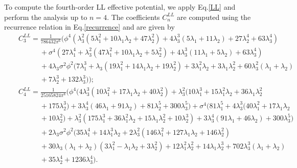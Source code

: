 \documentclass[11pt,a4paper,english,superscriptaddress,preprint,aps,prd]{revtex4}
\begin{document}
To compute the fourth-order LL effective potential, we apply Eq.\eqref{LL} and perform the analysis up to $n=4$. The coefficients $C_n^{LL}$ are computed using the recurrence relation in Eq.\ref{recurrence} and are given by
\begin{subequations}
 \begin{eqnarray}
  &&C_3^{LL} = \frac{1}{786432 \pi ^6}\Bigr(\phi ^4 \left(\lambda_3^2 \left(5 \lambda_1^2+10 \lambda_1 \lambda_2+47 \lambda_2^2\right)+4 \lambda_3^3 (5 \lambda_1+11 \lambda_2)+27 \lambda_2^4+63 \lambda_3^4\right)\nonumber\\
  &&\qquad\quad+\sigma ^4 \left(27 \lambda_1^4+\lambda_3^2 \left(47 \lambda_1^2+10 \lambda_1 \lambda_2+5 \lambda_2^2\right)+4 \lambda_3^3 (11 \lambda_1+5 \lambda_2)+63 \lambda_3^4\right)\nonumber\\
  &&\qquad\quad+4 \lambda_3 \sigma ^2 \phi ^2 (7 \lambda_1^3+\lambda_3 \left(19 \lambda_1^2+14 \lambda_1 \lambda_2+19 \lambda_2^2\right)+3 \lambda_1^2 \lambda_2+3 \lambda_1 \lambda_2^2+60 \lambda_3^2 (\lambda_1+\lambda_2)\nonumber\\
  &&\qquad\quad+7 \lambda_2^3+132 \lambda_3^3)\Bigr);\\
  &&C_4^{LL} = \frac{1}{25165824 \pi ^8}\Bigr(\phi ^4 (4 \lambda_3^3 \left(10 \lambda_1^2+17 \lambda_1 \lambda_2+40 \lambda_2^2\right)+\lambda_3^2 (10 \lambda_1^3+15 \lambda_1^2 \lambda_2+36 \lambda_1 \lambda_2^2\nonumber\\
  &&\qquad\quad+175 \lambda_2^3)+3 \lambda_3^4 (46 \lambda_1+91 \lambda_2)+81 \lambda_2^5+300 \lambda_3^5)+\sigma ^4 (81 \lambda_1^5+4 \lambda_3^3 (40 \lambda_1^2+17 \lambda_1 \lambda_2\nonumber\\
  &&\qquad\quad+10 \lambda_2^2)+\lambda_3^2 (175 \lambda_1^3+36 \lambda_1^2 \lambda_2+15 \lambda_1 \lambda_2^2+10 \lambda_2^3)+3 \lambda_3^4 (91 \lambda_1+46 \lambda_2)+300 \lambda_3^5)\nonumber\\
  &&\qquad\quad+2 \lambda_3 \sigma ^2 \phi ^2 (35 \lambda_1^4+14 \lambda_1^3 \lambda_2+2 \lambda_3^2 \left(146 \lambda_1^2+127 \lambda_1 \lambda_2+146 \lambda_2^2\right)\nonumber\\
  &&\qquad\quad+30 \lambda_3 (\lambda_1+\lambda_2) \left(3 \lambda_1^2-\lambda_1 \lambda_2+3 \lambda_2^2\right)+12 \lambda_1^2 \lambda_2^2+14 \lambda_1 \lambda_2^3+702 \lambda_3^3 (\lambda_1+\lambda_2)\nonumber\\
  &&\qquad\quad+35 \lambda_2^4+1236 \lambda_3^4).
 \end{eqnarray}
\end{subequations}
\end{document}
